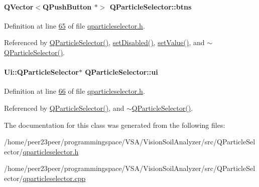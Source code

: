 \paragraph[{btns}]{\setlength{\rightskip}{0pt plus 5cm}Q\+Vector$<$Q\+Push\+Button $\ast$$>$ Q\+Particle\+Selector\+::btns\hspace{0.3cm}{\ttfamily [private]}}\label{class_q_particle_selector_ad3396ef1085219165de749b7e1cbcebd}


Definition at line \hyperlink{qparticleselector_8h_source_l00065}{65} of file \hyperlink{qparticleselector_8h_source}{qparticleselector.\+h}.



Referenced by \hyperlink{qparticleselector_8cpp_source_l00004}{Q\+Particle\+Selector()}, \hyperlink{qparticleselector_8cpp_source_l00039}{set\+Disabled()}, \hyperlink{qparticleselector_8cpp_source_l00035}{set\+Value()}, and \hyperlink{qparticleselector_8cpp_source_l00027}{$\sim$\+Q\+Particle\+Selector()}.

\hypertarget{class_q_particle_selector_afc6d3b0296f0842e3e3f410916ab1e70}{}
\paragraph[{ui}]{\setlength{\rightskip}{0pt plus 5cm}Ui\+::\+Q\+Particle\+Selector$\ast$ Q\+Particle\+Selector\+::ui\hspace{0.3cm}{\ttfamily [private]}}\label{class_q_particle_selector_afc6d3b0296f0842e3e3f410916ab1e70}


Definition at line \hyperlink{qparticleselector_8h_source_l00066}{66} of file \hyperlink{qparticleselector_8h_source}{qparticleselector.\+h}.



Referenced by \hyperlink{qparticleselector_8cpp_source_l00004}{Q\+Particle\+Selector()}, and \hyperlink{qparticleselector_8cpp_source_l00027}{$\sim$\+Q\+Particle\+Selector()}.



The documentation for this class was generated from the following files\+:\begin{DoxyCompactItemize}
\item 
/home/peer23peer/programmingspace/\+V\+S\+A/\+Vision\+Soil\+Analyzer/src/\+Q\+Particle\+Selector/\hyperlink{qparticleselector_8h}{qparticleselector.\+h}\item 
/home/peer23peer/programmingspace/\+V\+S\+A/\+Vision\+Soil\+Analyzer/src/\+Q\+Particle\+Selector/\hyperlink{qparticleselector_8cpp}{qparticleselector.\+cpp}\end{DoxyCompactItemize}
